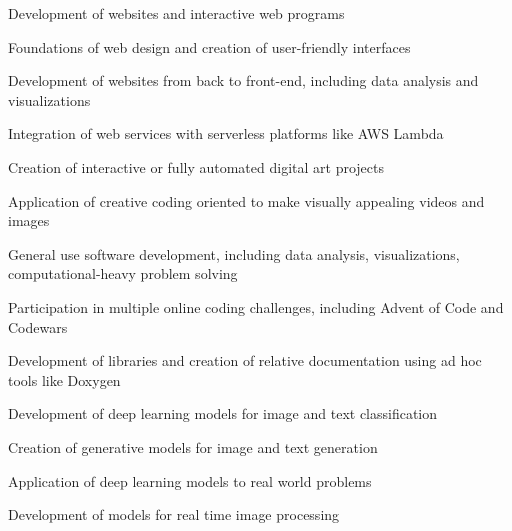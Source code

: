 \documentclass[]{plushcv}
\begin{document}
\begin{minipage}[t]{0.60\textwidth}

  \begin{tightemize}
    \item Development of websites and interactive web programs
    \item Foundations of web design and creation of user-friendly interfaces
  \end{tightemize}
  \sectionsep

  \begin{tightemize}
    \item Development of websites from back to front-end, including data analysis and visualizations
    \item Integration of web services with serverless platforms like AWS Lambda
  \end{tightemize}
  \sectionsep

  \begin{tightemize}
    \item Creation of interactive or fully automated digital art projects
    \item Application of creative coding oriented to make visually appealing videos and images
  \end{tightemize}
  \sectionsep

  \begin{tightemize}
    \item General use software development, including data analysis, visualizations, computational-heavy problem solving
    \item Participation in multiple online coding challenges, including Advent of Code and Codewars
    \item Development of libraries and creation of relative documentation using ad hoc tools like Doxygen
  \end{tightemize}
  \sectionsep

  \begin{tightemize}
    \item Development of deep learning models for image and text classification
    \item Creation of generative models for image and text generation
    \item Application of deep learning models to real world problems
    \item Development of models for real time image processing
  \end{tightemize}
  \sectionsep


\end{minipage}
\end{document}
